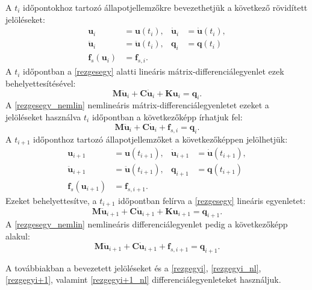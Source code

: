 A $t_i$ időpontokhoz tartozó állapotjellemzőkre bevezethetjük a következő rövidített jelöléseket:
%
\begin{align*} 
\label{eq:u_i}
\mathbf{u}_i & = \mathbf{u}(t_i),  & \mathbf{\dot{u}}_i & = \mathbf{\dot{u}}(t_i),  \\
\mathbf{\ddot{u}}_i & = \mathbf{\ddot{u}}(t_i),  & \mathbf{q}_i & = \mathbf{q}(t_i) \\
\mathbf{f}_{s}(\mathbf{u}_{i}) & = \mathbf{f}_{s,i}. 
\end{align*}
%
A $t_i$ időpontban a \eqref{rezgesegy} alatti lineáris mátrix-differenciálegyenlet ezek behelyettesítésével:
%
\begin{equation}
\label{rezgegyi}
\mathbf{M}\mathbf{\ddot{u}}_i+\mathbf{C}\mathbf{\dot{u}}_i+\mathbf{K}\mathbf{u}_i = \mathbf{q}_{i}.
\end{equation}
%
A \eqref{rezgesegy_nemlin} nemlineáris mátrix-differenciálegyenletet  ezeket a jelöléseket használva  $t_i$ időpontban a következőképp írhatjuk fel:
%
\begin{equation}
\label{rezgegyi_nl}
\mathbf{M}\mathbf{\ddot{u}}_i+\mathbf{C}\mathbf{\dot{u}}_i+\mathbf{f}_{s,i} = \mathbf{q}_{i}.
\end{equation}
%
A $t_{i+1}$ időponthoz tartozó állapotjellemzőket a következőképpen jelölhetjük:
%
\begin{align*} 
\label{eq:u_i1}
\mathbf{u}_{i+1} & = \mathbf{u}(t_{i+1}),  & \mathbf{\dot{u}}_{i+1} & = \mathbf{\dot{u}}(t_{i+1}),  \\
\mathbf{\ddot{u}}_{i+1} & = \mathbf{\ddot{u}}(t_{i+1}),  & \mathbf{q}_{i+1} & = \mathbf{q}(t_{i+1}) \\
\mathbf{f}_{s}(\mathbf{u}_{i+1}) & = \mathbf{f}_{s,i+1}. 
\end{align*}
%
Ezeket behelyettesítve, a $t_{i+1}$ időpontban felírva a \eqref{rezgesegy} lineáris egyenletet:
%
\begin{equation}
\label{rezgegyi+1}
\mathbf{M}\mathbf{\ddot{u}}_{i+1}+\mathbf{C}\mathbf{\dot{u}}_{i+1}+\mathbf{K}\mathbf{u}_{i+1}=\mathbf{q}_{i+1}.
\end{equation}
%
A  \eqref{rezgesegy_nemlin} nemlineáris differenciálegyenlet pedig a következőképp alakul:
%
\begin{equation}
\label{rezgegyi+1_nl}
\mathbf{M}\mathbf{\ddot{u}}_{i+1}+\mathbf{C}\mathbf{\dot{u}}_{i+1}+\mathbf{f}_{s,i+1}=\mathbf{q}_{i+1}.
\end{equation}

A továbbiakban a bevezetett jelöléseket és a  \eqref{rezgegyi}, \eqref{rezgegyi_nl}, \eqref{rezgegyi+1}, valamint \eqref{rezgegyi+1_nl} differenciálegyenleteket használjuk. 


